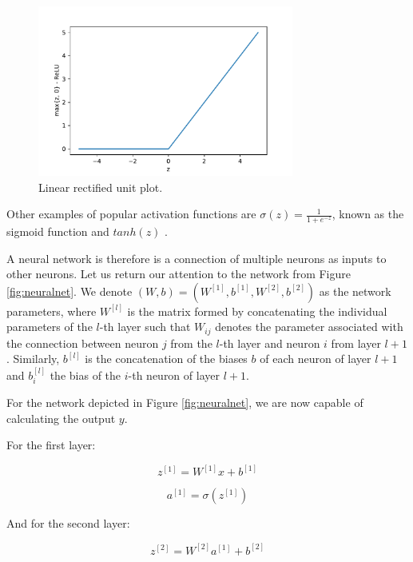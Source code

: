 \begin{figure}[h]
    \centering
    \includegraphics[width=0.75\textwidth]{Chapter3/relu.pdf}
    \caption{Linear rectified unit plot.}
    \label{fig:relu}
\end{figure}

Other examples of popular activation functions are $\sigma(z) = \frac{1}{1 + e^{-z}}$, known as the sigmoid function
and $tanh(z)$ \cite{ActivationFunction}.

A neural network is therefore is a connection of multiple neurons as inputs to other neurons.
Let us return our attention to the network from Figure \ref{fig:neuralnet}.
We denote $(W,b) = (W^{[1]}, b^{[1]}, W^{[2]}, b^{[2]})$ as the network parameters, where $W^{[l]}$ is 
the matrix formed by concatenating the individual parameters of the $l$-th layer such that
$W_{ij}$ denotes the parameter associated with the connection between neuron $j$ from the $l$-th layer 
and neuron $i$ from layer $l + 1$.
Similarly, $b^{[l]}$ is the concatenation of the biases $b$ of each neuron of layer $l + 1$ and 
$b_i^{[l]}$ the bias of the $i$-th neuron of layer $l + 1$.

For the network depicted in Figure \ref{fig:neuralnet}, we are now capable of calculating the output $y$.

For the first layer: 

\begin{equation}
    z^{[1]}  = W^{[1]}x + b^{[1]} 
\end{equation}

\begin{equation}
   a^{[1]}  = \sigma(z^{[1]})
\end{equation}

And for the second layer:

\begin{equation}
    z^{[2]} = W^{[2]}a^{[1]} + b^{[2]}
\end{equation}

